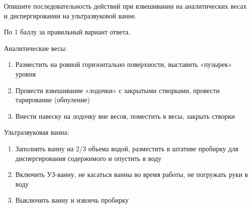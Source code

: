 
Опишите последовательность действий при взвешивании на аналитических весах и диспергировании на ультразвуковой ванне.

По 1 баллу за правильный вариант ответа.

\answerMath

Аналитические весы:

\begin{enumerate}
    \item Разместить на ровной горизонтально поверхности, выставить «пузырек» уровня
    \item Провести взвешивание «лодочки» с закрытыми створками, провести тарирование (обнуление)
    \item Внести навеску на лодочку вне весов, поместить в весы, закрыть створки
\end{enumerate}

Ультразвуковая ванна:

\begin{enumerate}
    \item Заполнить ванну на 2/3 объема водой, разместить в штативе пробирку для диспергирования содержимого и опустить в воду
    \item Включить УЗ-ванну, не касаться ванны во время работы, не погружать руки в воду
    \item Выключить ванну и извлечь пробирку
\end{enumerate}
